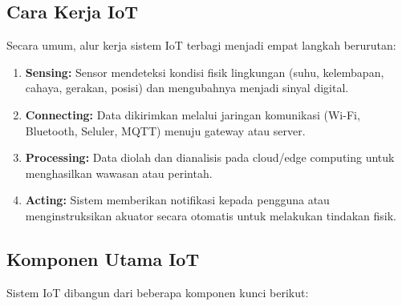 \subsection{Cara Kerja IoT}
Secara umum, alur kerja sistem IoT terbagi menjadi empat langkah berurutan:

\begin{center}
\end{center}

\begin{enumerate}
    \item \textbf{Sensing:} Sensor mendeteksi kondisi fisik lingkungan (suhu, kelembapan, cahaya, gerakan, posisi) dan mengubahnya menjadi sinyal digital.
    \item \textbf{Connecting:} Data dikirimkan melalui jaringan komunikasi (Wi-Fi, Bluetooth, Seluler, MQTT) menuju gateway atau server.
    \item \textbf{Processing:} Data diolah dan dianalisis pada cloud/edge computing untuk menghasilkan wawasan atau perintah.
    \item \textbf{Acting:} Sistem memberikan notifikasi kepada pengguna atau menginstruksikan akuator secara otomatis untuk melakukan tindakan fisik.
\end{enumerate}

\subsection{Komponen Utama IoT}
Sistem IoT dibangun dari beberapa komponen kunci berikut:

